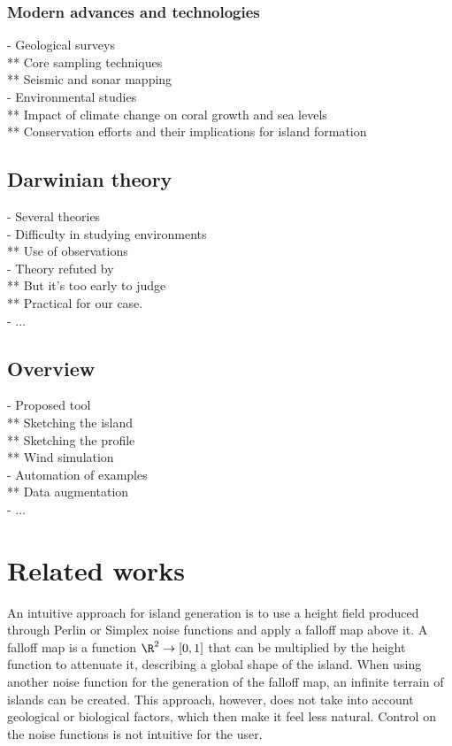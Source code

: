 \subsubsection{Modern advances and technologies}
- Geological surveys \\
** Core sampling techniques \\
** Seismic and sonar mapping \\
- Environmental studies \\
** Impact of climate change on coral growth and sea levels \\
** Conservation efforts and their implications for island formation

\subsection{Darwinian theory}
- Several theories \\
- Difficulty in studying environments \\
** Use of observations \\
- Theory refuted by \cite{Droxler2021} \\
** But it's too early to judge \\
** Practical for our case. \\
- ...


\subsection{Overview}
- Proposed tool \\
** Sketching the island \\
** Sketching the profile \\
** Wind simulation \\
- Automation of examples \\
** Data augmentation \\
- ...

\section{Related works}
\label{sec:coral-island_related-works}
An intuitive approach for island generation is to use a height field produced through Perlin or Simplex noise functions and apply a falloff map above it. A falloff map is a function $\R^2 \to [0, 1]$ that can be multiplied by the height function to attenuate it, describing a global shape of the island. When using another noise function for the generation of the falloff map, an infinite terrain of islands can be created. This approach, however, does not take into account geological or biological factors, which then make it feel less natural. Control on the noise functions is not intuitive for the user.

